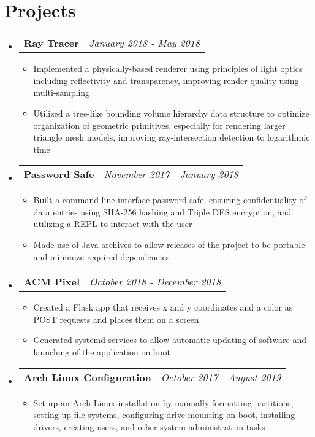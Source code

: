 \documentclass[letterpaper,11pt]{article}
\makeatletter
\newcommand{\resumeBullet}[1]
{\item\small
	{#1 \vspace{-2pt}
	}
}
\newcommand{\resumeSubheading}[2]
{\vspace{-1pt}\item[]
	\begin{tabular*}{0.97\textwidth}{l@{\extracolsep{\fill}}r}
		\textbf{#1} & \textit{\small #2} \\
	\end{tabular*}\vspace{-6pt}
}
\newcommand{\resumeSubHeadingListStart}{\begin{itemize}[leftmargin=*,itemsep=0.2pt]}
\newcommand{\resumeSubHeadingListEnd}{\end{itemize}}
\newcommand{\resumeItemListStart}{\begin{itemize}[itemsep=0.2pt]}
\newcommand{\resumeItemListEnd}{\end{itemize}\vspace{-5pt}}
\makeatother
\begin{document}
\section{Projects}
\resumeSubHeadingListStart
\resumeSubheading{Ray Tracer}{January 2018 - May 2018}
\resumeItemListStart
\resumeBullet{Implemented a physically-based renderer using principles of light optics including reflectivity and transparency, improving render quality using multi-sampling}
\resumeBullet{Utilized a tree-like bounding volume hierarchy data structure to optimize organization of geometric primitives, especially for rendering larger triangle mesh models, improving ray-intersection detection to logarithmic time}
\resumeItemListEnd
\resumeSubheading{Password Safe}{November 2017 - January 2018}
\resumeItemListStart
\resumeBullet
{Built a command-line interface password safe, ensuring confidentiality of data entries using SHA-256 hashing and Triple DES encryption, and utilizing a REPL to interact with the user}
\resumeBullet
{Made use of Java archives to allow releases of the project to be portable and minimize required dependencies}
\resumeItemListEnd
\resumeSubheading{ACM Pixel}{October 2018 - December 2018}
\resumeItemListStart
\resumeBullet{Created a Flask app that receives x and y coordinates and a color as POST requests and places them on a screen}
\resumeBullet{Generated systemd services to allow automatic updating of software and launching of the application on boot}
\resumeItemListEnd
\resumeSubheading{Arch Linux Configuration}{October 2017 - August 2019}
\resumeItemListStart
\resumeBullet
{Set up an Arch Linux installation by manually formatting partitions, setting up file systems, configuring drive mounting on boot, installing drivers, creating users, and other system administration tasks}
\resumeItemListEnd
\resumeSubHeadingListEnd

\end{document}
